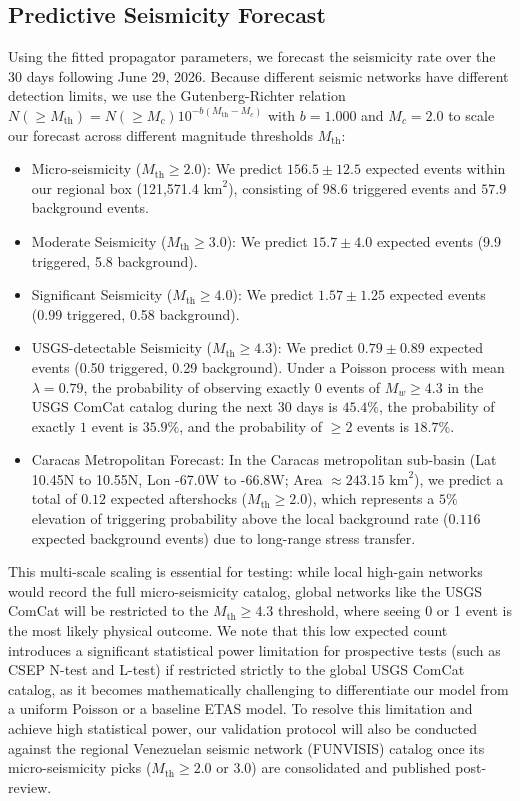 \documentclass[twocolumn,amsmath,amssymb,aps,pre,superscriptaddress]{revtex4-1}
\begin{document}
\subsection{Predictive Seismicity Forecast}
Using the fitted propagator parameters, we forecast the seismicity rate over the 30 days following June 29, 2026. Because different seismic networks have different detection limits, we use the Gutenberg-Richter relation $N(\ge M_{\text{th}}) = N(\ge M_c) 10^{-b(M_{\text{th}} - M_c)}$ with $b = 1.000$ and $M_c = 2.0$ to scale our forecast across different magnitude thresholds $M_{\text{th}}$:
\begin{itemize}
    \item Micro-seismicity ($M_{\text{th}} \ge 2.0$): We predict $156.5 \pm 12.5$ expected events within our regional box (121,571.4 $\text{km}^2$), consisting of $98.6$ triggered events and $57.9$ background events.
    \item Moderate Seismicity ($M_{\text{th}} \ge 3.0$): We predict $15.7 \pm 4.0$ expected events (9.9 triggered, 5.8 background).
    \item Significant Seismicity ($M_{\text{th}} \ge 4.0$): We predict $1.57 \pm 1.25$ expected events (0.99 triggered, 0.58 background).
    \item USGS-detectable Seismicity ($M_{\text{th}} \ge 4.3$): We predict $0.79 \pm 0.89$ expected events (0.50 triggered, 0.29 background). Under a Poisson process with mean $\lambda = 0.79$, the probability of observing exactly $0$ events of $M_w \ge 4.3$ in the USGS ComCat catalog during the next 30 days is $45.4\%$, the probability of exactly $1$ event is $35.9\%$, and the probability of $\ge 2$ events is $18.7\%$.
    \item Caracas Metropolitan Forecast: In the Caracas metropolitan sub-basin (Lat 10.45N to 10.55N, Lon -67.0W to -66.8W; Area $\approx 243.15$ $\text{km}^2$), we predict a total of $0.12$ expected aftershocks ($M_{\text{th}} \ge 2.0$), which represents a $5\%$ elevation of triggering probability above the local background rate ($0.116$ expected background events) due to long-range stress transfer.
\end{itemize}
This multi-scale scaling is essential for testing: while local high-gain networks would record the full micro-seismicity catalog, global networks like the USGS ComCat will be restricted to the $M_{\text{th}} \ge 4.3$ threshold, where seeing 0 or 1 event is the most likely physical outcome. We note that this low expected count introduces a significant statistical power limitation for prospective tests (such as CSEP N-test and L-test) if restricted strictly to the global USGS ComCat catalog, as it becomes mathematically challenging to differentiate our model from a uniform Poisson or a baseline ETAS model. To resolve this limitation and achieve high statistical power, our validation protocol will also be conducted against the regional Venezuelan seismic network (FUNVISIS) catalog once its micro-seismicity picks ($M_{\text{th}} \ge 2.0$ or $3.0$) are consolidated and published post-review.
\end{document}
